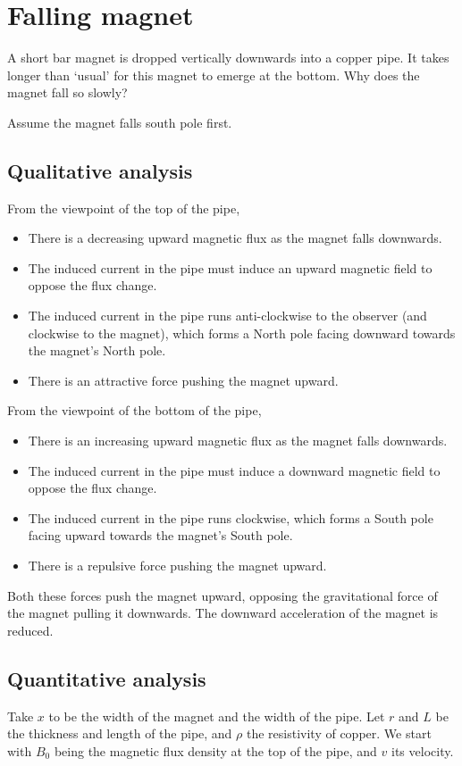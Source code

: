 \section{Falling magnet}
\begin{problem}
A short bar magnet is dropped vertically downwards into a copper pipe.
It takes longer than `usual' for this magnet to emerge at the bottom.
Why does the magnet fall so slowly?
\end{problem}
Assume the magnet falls south pole first.

\subsection{Qualitative analysis}
From the viewpoint of the top of the pipe,
\begin{itemize}
	\item There is a decreasing upward magnetic flux as the magnet falls downwards.
	\item The induced current in the pipe must induce an upward magnetic field to oppose the flux change.
	\item The induced current in the pipe runs anti-clockwise to the observer (and clockwise to the magnet), which forms a North pole facing downward towards the magnet's North pole.
	\item There is an attractive force pushing the magnet upward.
\end{itemize}

From the viewpoint of the bottom of the pipe,
\begin{itemize}
	\item There is an increasing upward magnetic flux as the magnet falls downwards.
	\item The induced current in the pipe must induce a downward magnetic field to oppose the flux change.
	\item The induced current in the pipe runs clockwise, which forms a South pole facing upward towards the magnet's South pole.
	\item There is a repulsive force pushing the magnet upward.
\end{itemize}

Both these forces push the magnet upward, opposing the gravitational force of the magnet pulling it downwards.
The downward acceleration of the magnet is reduced.

\subsection{Quantitative analysis}
Take \(x\) to be the width of the magnet and the width of the pipe.
Let \(r\) and \(L\) be the thickness and length of the pipe, and \(\rho\) the resistivity of copper.
We start with \(B_0\) being the magnetic flux density at the top of the pipe, and \(v\) its velocity.


